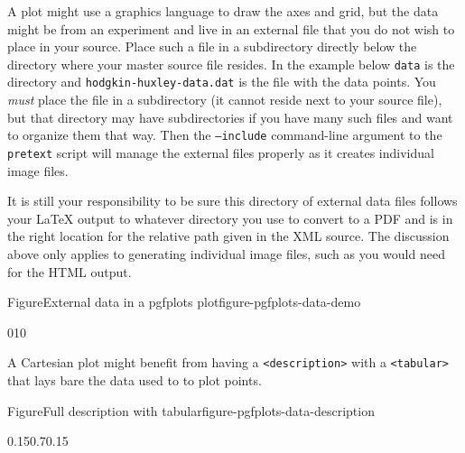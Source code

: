 \documentclass{sn-jnl}
\theoremstyle{thmstyleone}%
\theoremstyle{thmstyletwo}%
\theoremstyle{thmstylethree}%
\newcommand{\mono}[1]{\texttt{#1}}
\numberwithin{equation}{section}
\begin{document}
A plot might use a graphics language to draw the axes and grid, but the data might be from an experiment and live in an external file that you do not wish to place in your source.  Place such a file in a subdirectory directly below the directory where your master source file resides.  In the example below \mono{data} is the directory and \mono{hodgkin-huxley-data.dat} is the file with the data points.  You \emph{must} place the file in a subdirectory (it cannot reside next to your source file), but that directory may have subdirectories if you have many such files and want to organize them that way.  Then the \mono{--include} command-line argument to the \mono{pretext} script will manage the external files properly as it creates individual image files.%
\par
It is still your responsibility to be sure this directory of external data files follows your \LaTeX{} output to whatever directory you use to convert to a PDF and is in the right location for the relative path given in the XML source.  The discussion above only applies to generating individual image files, such as you would need for the HTML output.%
\begin{figureptx}{Figure}{External data in a pgfplots plot}{figure-pgfplots-data-demo}{}%
\begin{image}{0}{1}{0}{}%
%
\end{image}%
\tcblower
\end{figureptx}%
A Cartesian plot might benefit from having a \mono{<description>} with a \mono{<tabular>} that lays bare the data used to to plot points.%
\begin{figureptx}{Figure}{Full description with tabular}{figure-pgfplots-data-description}{}%
\begin{image}{0.15}{0.7}{0.15}{}%
%
\end{image}%
\tcblower
\end{figureptx}%
\end{document}

